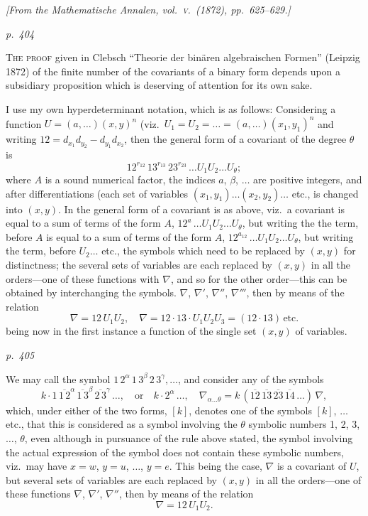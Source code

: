 \documentclass[11pt,a4paper]{article}
\theoremstyle{plain}
\theoremstyle{definition}
\begin{document}
\begin{center}
\textit{[From the Mathematische Annalen, vol.~\textsc{v}.\ (1872), pp.~625--629.]}
\end{center}

\textit{p.~404}

\noindent
\textsc{The proof} given in Clebsch ``Theorie der bin\"aren algebraischen Formen'' (Leipzig 1872)
of the finite number of the covariants of a binary form depends upon a subsidiary
proposition which is deserving of attention for its own sake.

I use my own hyperdeterminant notation, which is as follows: Considering a
function $U = (a, \ldots)(x, y)^n$ (viz.\ $U_1 = U_2 = \ldots = (a, \ldots)(x_1, y_1)^n$ and writing $12 = d_{x_1} d_{y_2} - d_{y_1} d_{x_2}$,
then the general form of a covariant of the degree $\theta$ is
\[
12^{r_{12}}\,13^{r_{13}}\,23^{r_{23}}\,\ldots U_1 U_2 \ldots U_\theta;
\]
where $A$ is a sound numerical factor, the indices $a$, $\beta$, $\ldots$ are positive integers, and
after differentiations (each set of variables $(x_1, y_1)\ldots(x_2, y_2)\ldots$ etc., is changed into
$(x, y)$.  In the general form of a covariant is as above, viz.\ a covariant is equal to
a sum of terms of the form $A$, $12^{a}\,\ldots U_1 U_2 \ldots U_\theta$, but writing the the term, before
$A$ is equal to a sum of terms of the form $A$, $12^{a_{12}}\,\ldots U_1 U_2 \ldots U_\theta$, but writing the term, before
$U_2 \ldots$ etc., the symbols which need to be replaced by $(x, y)$ for distinctness; the
several sets of variables are each replaced by $(x, y)$ in all the orders---one of these
functions with $\nabla$, and so for the other order---this can be obtained by interchanging
the symbols.  $\nabla$, $\nabla'$, $\nabla''$, $\nabla'''$, then by means of the relation
\[
\nabla = 12 \, U_1 U_2,\quad \nabla = 12 \cdot 13 \cdot U_1 U_2 U_3 = (12 \cdot 13)\,\text{etc.}
\]
being now in the first instance a function of the single set $(x, y)$ of variables.

\clearpage

\bigskip
\textit{p.~405}
\smallskip

\noindent
We may call the symbol $1\,2^{\alpha}\,1\,3^{\beta}\,2\,3^{\gamma}, \ldots$, and consider any of the symbols
\[
k \cdot 1\,\overline{1\,2}^{\alpha}\,\overline{1\,3}^{\beta}\,\overline{2\,3}^{\gamma}\,\ldots,\quad \text{or}\quad k \cdot 2^{\alpha}\,\ldots,\quad \nabla_{\alpha\ldots\theta} = k\,(\overline{12}\,\overline{13}\,\overline{23}\,\overline{14}\,\ldots)\,\nabla,
\]
which, under either of the two forms, $[k]$, denotes one of the symbols $[k]$, $\ldots$ etc.,
that this is considered as a symbol involving the $\theta$ symbolic numbers 1, 2, 3, $\ldots$, $\theta$,
even although in pursuance of the rule above stated, the symbol involving
the actual expression of the symbol does not contain these symbolic numbers, viz.\ may
have $x = w$, $y = u$, $\ldots$, $y = e$.  This being the case, $\nabla$ is a covariant of $U$, but
several sets of variables are each replaced by $(x, y)$ in all the orders---one of these
functions $\nabla$, $\nabla'$, $\nabla''$, then by means of the relation
\[
\nabla = 12 \, U_1 U_2.
\]
\end{document}
